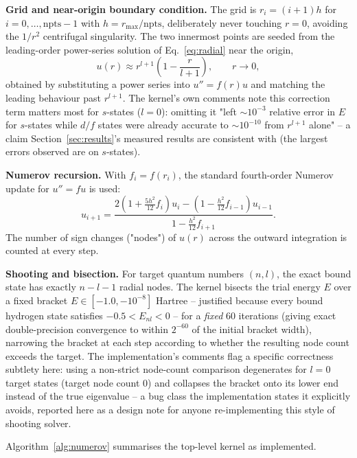 \documentclass[pdflatex,sn-mathphys,Numbered]{sn-jnl}
\begin{document}
\textbf{Grid and near-origin boundary condition.} The grid is $r_i=(i+1)h$ for $i=0,\dots,\text{npts}-1$ with $h=r_{\max}/\text{npts}$, deliberately never touching $r=0$, avoiding the $1/r^2$ centrifugal singularity. The two innermost points are seeded from the leading-order power-series solution of Eq.~\eqref{eq:radial} near the origin,
\begin{equation}
u(r) \approx r^{l+1}\left(1 - \frac{r}{l+1}\right), \qquad r\to 0,
\label{eq:bc}
\end{equation}
obtained by substituting a power series into $u''=f(r)u$ and matching the leading behaviour past $r^{l+1}$. The kernel's own comments note this correction term matters most for $s$-states ($l=0$): omitting it "left $\sim10^{-3}$ relative error in $E$ for $s$-states while $d/f$ states were already accurate to $\sim10^{-10}$ from $r^{l+1}$ alone" -- a claim Section~\ref{sec:results}'s measured results are consistent with (the largest errors observed are on $s$-states).

\textbf{Numerov recursion.} With $f_i=f(r_i)$, the standard fourth-order Numerov update for $u''=f u$ is used:
\begin{equation}
u_{i+1} = \frac{2\left(1+\tfrac{5h^2}{12}f_i\right)u_i - \left(1-\tfrac{h^2}{12}f_{i-1}\right)u_{i-1}}{1-\tfrac{h^2}{12}f_{i+1}}.
\label{eq:numerov}
\end{equation}
The number of sign changes ("nodes") of $u(r)$ across the outward integration is counted at every step.

\textbf{Shooting and bisection.} For target quantum numbers $(n,l)$, the exact bound state has exactly $n-l-1$ radial nodes. The kernel bisects the trial energy $E$ over a fixed bracket $E\in[-1.0,-10^{-8}]$ Hartree -- justified because every bound hydrogen state satisfies $-0.5<E_{nl}<0$ -- for a \emph{fixed} 60 iterations (giving exact double-precision convergence to within $2^{-60}$ of the initial bracket width), narrowing the bracket at each step according to whether the resulting node count exceeds the target. The implementation's comments flag a specific correctness subtlety here: using a non-strict node-count comparison degenerates for $l=0$ target states (target node count 0) and collapses the bracket onto its lower end instead of the true eigenvalue -- a bug class the implementation states it explicitly avoids, reported here as a design note for anyone re-implementing this style of shooting solver.

Algorithm~\ref{alg:numerov} summarises the top-level kernel as implemented.
\end{document}
